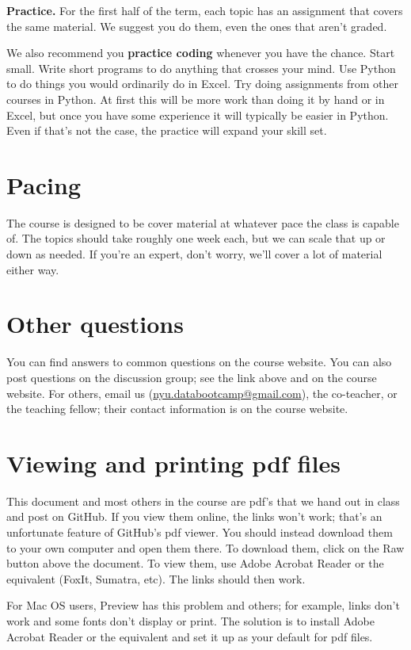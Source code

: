 \documentclass[11pt]{article}
\begin{document}
{\bf Practice.\/}
For the first half of the term, each topic has an assignment that covers the same material.
We suggest you do them, even the ones that aren't graded.

We also recommend you {\bf practice coding\/} whenever you have the chance.
Start small. Write short programs to do anything that crosses your mind.
Use Python to do things you would ordinarily do in Excel.
Try doing assignments from other courses in Python.
At first this will be more work than doing it by hand or in Excel,
but once you have some experience it will typically be easier in Python.
Even if that's not the case, the practice will expand your skill set.


\section*{Pacing}


The course is designed to be cover material at whatever pace the class is capable of.
The topics should take roughly one week each, but we can scale that up or down as needed.
If you're an expert, don't worry, we'll cover a lot of material either way.


\section*{Other questions}

You can find answers to common questions on the course website.
You can also post questions on the discussion group;
see the link above and on the course website.
For others, email us (\href{mailto:nyu.databootcamp@gmail.com}{nyu.databootcamp@gmail.com}),
the co-teacher, or the teaching fellow; their contact information is on the course website.


\section*{Viewing and printing pdf files}

This document and most others in the course are pdf's that we hand out in class and post on GitHub.
If you view them online, the links won't work; that's an unfortunate feature of GitHub's pdf viewer.
You should instead download them to your own computer and open them there.
To download them,
click on the Raw button above the document.
To view them, use Adobe Acrobat Reader or the equivalent (FoxIt, Sumatra, etc).
The links should then work.

For Mac OS users, Preview has this problem and others; for example,
links don't work and some fonts don't display or print.
The solution is to install Adobe Acrobat Reader or the equivalent
and set it up as your default for pdf files.
\end{document}
